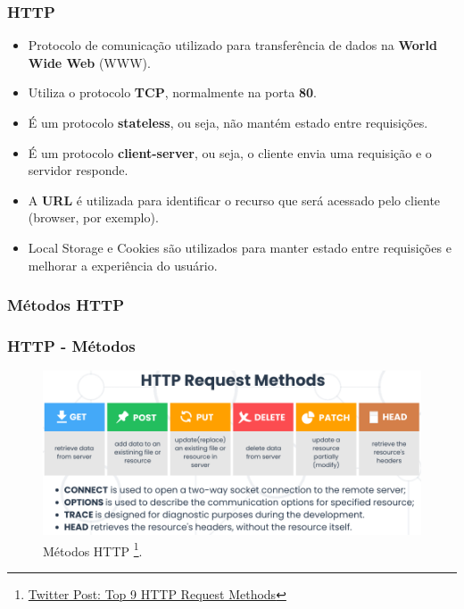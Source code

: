 \documentclass[
	10pt, %
	t, %
]{beamer}
\newcommand{\iconLink}[2]{\href{#1}{\faLink \hspace{0.2em} {#2}}}
\begin{document}
\begin{frame}
	\frametitle{HTTP}
	
	\begin{itemize}
		\item \alert{Protocolo} de comunicação utilizado para transferência de dados na \textbf{World Wide Web} (WWW).
		\item Utiliza o protocolo \textbf{TCP}, normalmente na porta \textbf{80}.
		\item É um protocolo \textbf{stateless}, ou seja, não mantém estado entre requisições.
		\item É um protocolo \textbf{client-server}, ou seja, o cliente envia uma requisição e o servidor responde.
		\item A \textbf{URL} é utilizada para identificar o recurso que será acessado pelo cliente (browser, por exemplo).
		\item \alert{Local Storage e Cookies} são utilizados para manter estado entre requisições e melhorar a experiência do usuário.
	\end{itemize}

\end{frame}

\subsubsection{Métodos HTTP}

\begin{frame}
	\frametitle{HTTP - Métodos}

	\begin{figure}
		\centering
		\includegraphics[width=0.9\linewidth]{methods.png}
		\caption{Métodos HTTP \footnote{\iconLink{https://pbs.twimg.com/media/F3Aak4jXoAAl4-y?format=jpg&name=large}{Twitter Post: Top 9 HTTP Request Methods}}.}
		\label{fig:httpmethods}
	\end{figure}

\end{frame}
\end{document}
